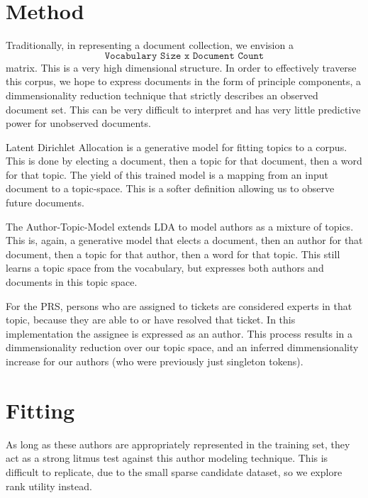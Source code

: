 \documentclass{article}
\begin{document}
\begin{multicols}{2}
\section{Method}

Traditionally, in representing a document collection, we envision a
\[\texttt{Vocabulary Size x Document Count} \]
matrix. This is a very high dimensional structure.
In order to effectively
traverse this corpus, we hope to express documents in the form of principle components,
a dimmensionality reduction technique that strictly describes an observed document
set. This can be very difficult to interpret and has very little predictive power for
unobserved documents.

Latent Dirichlet Allocation is a generative model for fitting topics to a corpus.
This is done by electing a document, then a topic for that document, then a word for that topic.
The yield of this trained model is a mapping from an input document to a topic-space.
This is a softer definition allowing us to observe future documents.

The Author-Topic-Model extends LDA to model authors as a mixture of topics. This is,
again, a generative model that elects a document, then an author for that document,
then a topic for that author, then a word for that topic. This still learns a topic space
from the vocabulary, but expresses both authors and documents in this topic space.

For the PRS, persons who are assigned to tickets are considered experts in that topic, because
they are able to or have resolved that ticket. In this implementation the assignee is expressed
as an author. This process results in a dimmensionality reduction over our topic space, and
an inferred dimmensionality increase for our authors (who were previously just singleton tokens).

\section{Fitting}

As long as these authors are appropriately represented in the training set, they act as
a strong litmus test against this author modeling technique. This is difficult to replicate,
due to the small sparse candidate dataset, so we explore rank utility\cite{Gunawardan,Silveira2017}
instead.


\end{multicols}
\end{document}
